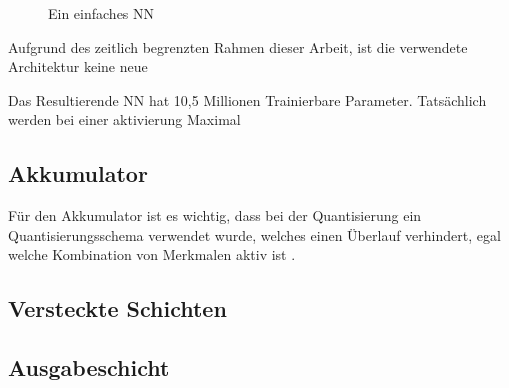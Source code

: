\begin{figure}
{
  }%
  \caption{Ein einfaches \acl{NN}}
  \label{fig:own-nn}
\end{figure}


Aufgrund des zeitlich begrenzten Rahmen dieser Arbeit, ist die verwendete Architektur keine neue

Das Resultierende \ac{NN} hat 10,5 Millionen Trainierbare Parameter. Tatsächlich werden bei einer aktivierung Maximal


\subsection{Akkumulator}


Für den Akkumulator ist es wichtig, dass bei der Quantisierung ein Quantisierungsschema verwendet wurde, welches einen Überlauf verhindert, egal welche Kombination von Merkmalen aktiv ist \cite{StockfishNNUE}.

\subsection{Versteckte Schichten}

\subsection{Ausgabeschicht}

